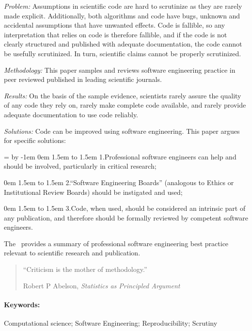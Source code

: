 \noindent\emph{Problem:} Assumptions in scientific code are hard to scrutinize as they are rarely made explicit. Additionally, both algorithms and code have bugs, unknown and accidental assumptions that have unwanted effects. Code is fallible, so any interpretation that relies on code is therefore fallible, and if the code is not clearly structured and published with adequate documentation, the code cannot be usefully scrutinized. In turn, scientific claims cannot be properly scrutinized.

\noindent\emph{Methodology:} This paper samples and reviews software engineering practice in peer reviewed published in leading scientific journals. 

\noindent\emph{Results:} On the basis of the sample evidence, scientists rarely assure the quality of any code they rely on, rarely make complete code available, and rarely provide adequate documentation to use code reliably.

\noindent\emph{Solutions:} Code can be improved using software engineering. This paper argues for specific solutions:

\newdimen \mywidth \mywidth=\textwidth
\advance \mywidth by -1em
 0em \textwidth 1.5em \mywidth 
\noindent 
\hbox to 1.5em{ 1.\hfill}Professional software engineers can help and should be involved, particularly in critical research; 

 0em \textwidth 1.5em \mywidth 
\noindent 
\hbox to 1.5em{ 2.\hfill}``Software Engineering Boards'' (analogous to Ethics or Institutional Review Boards) should be instigated and used; 

 0em \textwidth 1.5em \mywidth 
\noindent 
\hbox to 1.5em{ 3.\hfill}Code, when used, should be considered an intrinsic part of any publication, and therefore should be formally reviewed by competent software engineers. 

\noindent
The \supplement\ provides a summary of professional software engineering best practice relevant to scientific research and publication.


\vfill\begin{quote}
\hfill``Criticism is the mother of methodology.''
 
\hfill Robert P Abelson, \emph{Statistics as Principled Argument\/} \cite{abelson}\end{quote}
\vfill
\paragraph*{Keywords:} 
Computational science; Software Engineering; Reproducibility; Scrutiny

